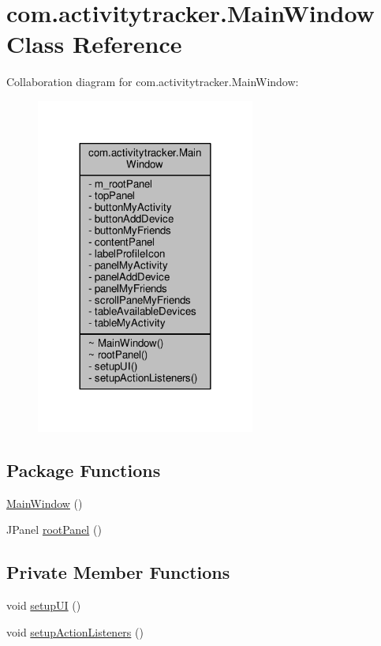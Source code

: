 \hypertarget{classcom_1_1activitytracker_1_1_main_window}{}\section{com.\+activitytracker.\+Main\+Window Class Reference}
\label{classcom_1_1activitytracker_1_1_main_window}


Collaboration diagram for com.\+activitytracker.\+Main\+Window\+:
\nopagebreak
\begin{figure}[H]
\begin{center}
\leavevmode
\includegraphics[width=204pt]{classcom_1_1activitytracker_1_1_main_window__coll__graph}
\end{center}
\end{figure}
\subsection*{Package Functions}
\begin{DoxyCompactItemize}
\item 
\hyperlink{classcom_1_1activitytracker_1_1_main_window_a77d0ebef154786202a165f496dc70065}{Main\+Window} ()
\item 
J\+Panel \hyperlink{classcom_1_1activitytracker_1_1_main_window_a62e9c6f477ccc5b93aff33abb567fde4}{root\+Panel} ()
\end{DoxyCompactItemize}
\subsection*{Private Member Functions}
\begin{DoxyCompactItemize}
\item 
void \hyperlink{classcom_1_1activitytracker_1_1_main_window_a53a019623a37b950473359fc625b6423}{setup\+UI} ()
\item 
void \hyperlink{classcom_1_1activitytracker_1_1_main_window_a76b3e8567b228ccd26f09c15ebaddb72}{setup\+Action\+Listeners} ()
\end{DoxyCompactItemize}
